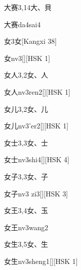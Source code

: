 \begin{entry}{大赛}{3,14}{⼤、⾙}
  \begin{phonetics}{大赛}{da4sai4}
  \end{phonetics}
\end{entry}

\begin{entry}{女}{3}{⼥}[Kangxi 38]
  \begin{phonetics}{女}{nv3}[][HSK 1]
  \end{phonetics}
\end{entry}

\begin{entry}{女人}{3,2}{⼥、⼈}
  \begin{phonetics}{女人}{nv3ren2}[][HSK 1]
  \end{phonetics}
\end{entry}

\begin{entry}{女儿}{3,2}{⼥、⼉}
  \begin{phonetics}{女儿}{nv3'er2}[][HSK 1]
  \end{phonetics}
\end{entry}

\begin{entry}{女士}{3,3}{⼥、⼠}
  \begin{phonetics}{女士}{nv3shi4}[][HSK 4]
  \end{phonetics}
\end{entry}

\begin{entry}{女子}{3,3}{⼥、⼦}
  \begin{phonetics}{女子}{nv3 zi3}[][HSK 3]
  \end{phonetics}
\end{entry}

\begin{entry}{女王}{3,4}{⼥、⽟}
  \begin{phonetics}{女王}{nv3wang2}
  \end{phonetics}
\end{entry}

\begin{entry}{女生}{3,5}{⼥、⽣}
  \begin{phonetics}{女生}{nv3sheng1}[][HSK 1]
  \end{phonetics}
\end{entry}


